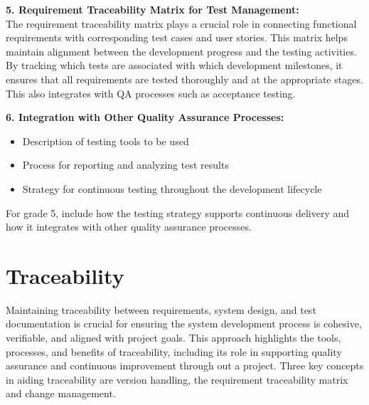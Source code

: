 \documentclass{article}
\begin{document}
\textbf{5. Requirement Traceability Matrix for Test Management:}\\
The requirement traceability matrix plays a crucial role in connecting functional requirements with corresponding test cases and user stories. This matrix helps maintain alignment between the development progress and the testing activities. By tracking which tests are associated with which development milestones, it ensures that all requirements are tested thoroughly and at the appropriate stages. This also integrates with QA processes such as acceptance testing.

\textbf{6. Integration with Other Quality Assurance Processes:}\\

\begin{itemize}
    \item Description of testing tools to be used
    \item Process for reporting and analyzing test results
    \item Strategy for continuous testing throughout the development lifecycle
\end{itemize}

For grade 5, include how the testing strategy supports continuous delivery and how it integrates with other quality assurance processes.

\newpage
\section{Traceability}

Maintaining traceability between requirements, system design, and test documentation is crucial for ensuring the system development process is cohesive, verifiable, and aligned with project goals. This approach highlights the tools, processes, and benefits of traceability, including its role in supporting quality assurance and continuous improvement through out a project. Three key concepts in aiding traceability are version handling, the requirement traceability matrix and change management.
\end{document}
